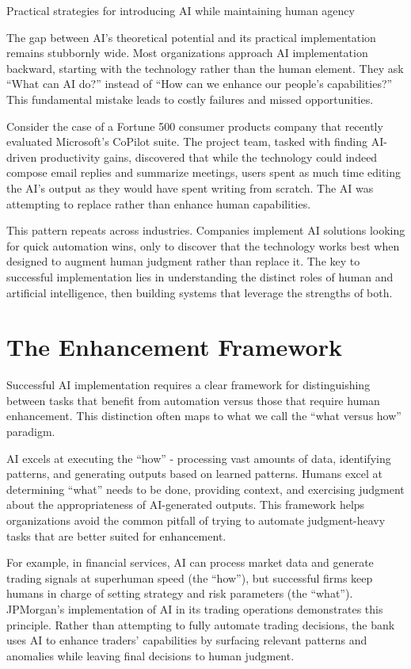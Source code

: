 \documentclass[
  Letterpaper,
]{scrbook}
\begin{document}
Practical strategies for introducing AI while maintaining human agency

\hfill\break

The gap between AI's theoretical potential and its practical
implementation remains stubbornly wide. Most organizations approach AI
implementation backward, starting with the technology rather than the
human element. They ask ``What can AI do?'' instead of ``How can we
enhance our people's capabilities?'' This fundamental mistake leads to
costly failures and missed opportunities.

Consider the case of a Fortune 500 consumer products company that
recently evaluated Microsoft's CoPilot suite. The project team, tasked
with finding AI-driven productivity gains, discovered that while the
technology could indeed compose email replies and summarize meetings,
users spent as much time editing the AI's output as they would have
spent writing from scratch. The AI was attempting to replace rather than
enhance human capabilities.

This pattern repeats across industries. Companies implement AI solutions
looking for quick automation wins, only to discover that the technology
works best when designed to augment human judgment rather than replace
it. The key to successful implementation lies in understanding the
distinct roles of human and artificial intelligence, then building
systems that leverage the strengths of both.

\section{The Enhancement Framework}\label{the-enhancement-framework}

Successful AI implementation requires a clear framework for
distinguishing between tasks that benefit from automation versus those
that require human enhancement. This distinction often maps to what we
call the ``what versus how'' paradigm.

AI excels at executing the ``how'' - processing vast amounts of data,
identifying patterns, and generating outputs based on learned patterns.
Humans excel at determining ``what'' needs to be done, providing
context, and exercising judgment about the appropriateness of
AI-generated outputs. This framework helps organizations avoid the
common pitfall of trying to automate judgment-heavy tasks that are
better suited for enhancement.

For example, in financial services, AI can process market data and
generate trading signals at superhuman speed (the ``how''), but
successful firms keep humans in charge of setting strategy and risk
parameters (the ``what''). JPMorgan's implementation of AI in its
trading operations demonstrates this principle. Rather than attempting
to fully automate trading decisions, the bank uses AI to enhance
traders' capabilities by surfacing relevant patterns and anomalies while
leaving final decisions to human judgment.
\end{document}
